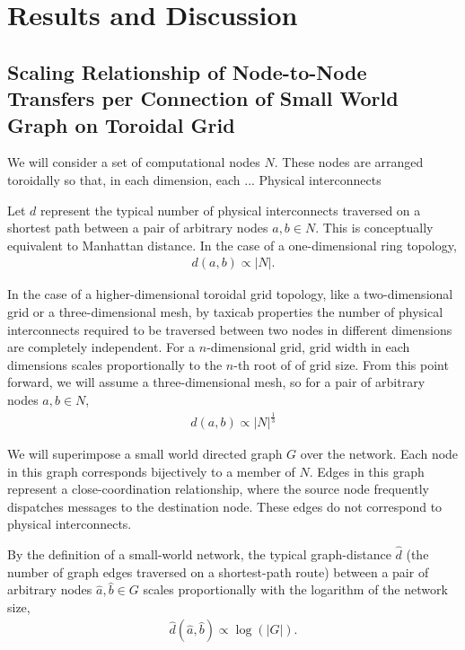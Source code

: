 \section{Results and Discussion}

\subsection{Scaling Relationship of Node-to-Node Transfers per Connection of Small World Graph on Toroidal Grid} \label{sec:scaling_toroidal}

We will consider a set of computational nodes $N$.
These nodes are arranged toroidally so that, in each dimension, each ...
Physical interconnects

Let $d$ represent the typical number of physical interconnects traversed on a shortest path between a pair of arbitrary nodes $a, b \in N$.
This is conceptually equivalent to Manhattan distance.
In the case of a one-dimensional ring topology,
\begin{align*}
d(a,b) \propto |N|.
\end{align*}

In the case of a higher-dimensional toroidal grid topology, like a two-dimensional grid or a three-dimensional mesh, by taxicab properties the number of physical interconnects required to be traversed between two nodes in different dimensions are completely independent.
For a $n$-dimensional grid, grid width in each dimensions scales proportionally to the $n$-th root of of grid size.
From this point forward, we will assume a three-dimensional mesh, so for a pair of arbitrary nodes $a,b \in N$,
\begin{align*}
d(a, b) \propto |N|^{\frac{1}{3}}
\end{align*}

We will superimpose a small world directed graph $G$ over the network.
Each node in this graph corresponds bijectively to a member of $N$.
Edges in this graph represent a close-coordination relationship, where the source node frequently dispatches messages to the destination node.
These edges do not correspond to physical interconnects.

By the definition of a small-world network, the typical graph-distance $\hat{d}$ (the number of graph edges traversed on a shortest-path route) between a pair of arbitrary nodes $\hat{a},\hat{b} \in G$ scales proportionally with the logarithm of the network size,
\begin{align*}
\hat{d}(\hat{a},\hat{b}) \propto \log(|G|).
\end{align*}

